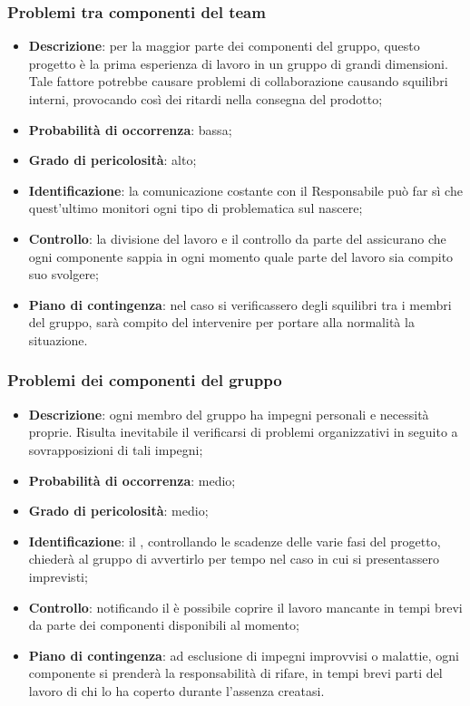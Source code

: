 \subsubsection{Problemi tra componenti del team}
\begin{itemize}
			\item \textbf{Descrizione}: per la maggior parte dei componenti del gruppo, questo progetto è la prima esperienza di lavoro in un gruppo di grandi dimensioni. Tale fattore potrebbe causare problemi di collaborazione causando squilibri interni, provocando così dei ritardi nella consegna del prodotto;
			\item \textbf{Probabilità di occorrenza}: bassa;
			\item \textbf{Grado di pericolosità}: alto;
			\item \textbf{Identificazione}: la comunicazione costante con il Responsabile può far sì che quest'ultimo monitori ogni tipo di problematica sul nascere;
			\item \textbf{Controllo}: la divisione del lavoro e il controllo da parte del  assicurano che ogni componente sappia in ogni momento quale parte del lavoro sia compito suo svolgere;
			\item \textbf{Piano di contingenza}: nel caso si verificassero degli squilibri tra i membri del gruppo, sarà compito del  intervenire per portare alla normalità la situazione.
\end{itemize}
		
\subsubsection{Problemi dei componenti del gruppo}
\begin{itemize}
			\item \textbf{Descrizione}: ogni membro del gruppo ha impegni personali e necessità proprie. Risulta inevitabile il verificarsi di problemi organizzativi in seguito a sovrapposizioni di tali impegni;
			\item \textbf{Probabilità di occorrenza}: medio;
			\item \textbf{Grado di pericolosità}: medio;
			\item \textbf{Identificazione}: il , controllando le scadenze delle varie fasi del progetto, chiederà al gruppo di avvertirlo per tempo nel caso in cui si presentassero imprevisti;
			\item \textbf{Controllo}: notificando il  è possibile coprire il lavoro mancante in tempi brevi da parte dei componenti disponibili al momento;
			\item \textbf{Piano di contingenza}: ad esclusione di impegni improvvisi o malattie, ogni componente si prenderà la responsabilità di rifare, in tempi brevi parti del lavoro di chi lo ha coperto durante l'assenza creatasi.
\end{itemize}
		
